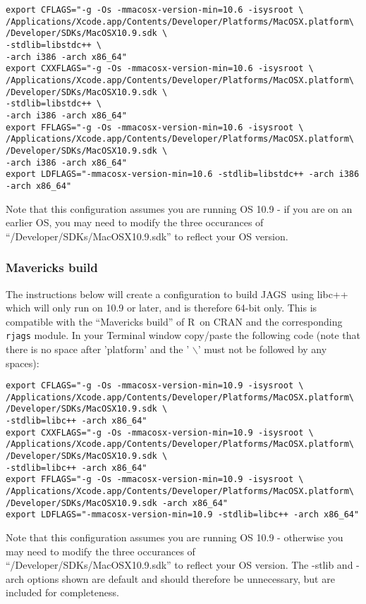 \documentclass[11pt, a4paper, titlepage]{article}
\newcommand{\JAGS}{\textsf{JAGS}}
\newcommand{\R}{\textsf{R}}
\begin{document}
\begin{verbatim}
export CFLAGS="-g -Os -mmacosx-version-min=10.6 -isysroot \
/Applications/Xcode.app/Contents/Developer/Platforms/MacOSX.platform\
/Developer/SDKs/MacOSX10.9.sdk \
-stdlib=libstdc++ \
-arch i386 -arch x86_64"
export CXXFLAGS="-g -Os -mmacosx-version-min=10.6 -isysroot \
/Applications/Xcode.app/Contents/Developer/Platforms/MacOSX.platform\
/Developer/SDKs/MacOSX10.9.sdk \
-stdlib=libstdc++ \
-arch i386 -arch x86_64"
export FFLAGS="-g -Os -mmacosx-version-min=10.6 -isysroot \
/Applications/Xcode.app/Contents/Developer/Platforms/MacOSX.platform\
/Developer/SDKs/MacOSX10.9.sdk \
-arch i386 -arch x86_64"
export LDFLAGS="-mmacosx-version-min=10.6 -stdlib=libstdc++ -arch i386 -arch x86_64"
\end{verbatim}

Note that this configuration assumes you are running OS 10.9 - if you 
are on an earlier OS, you may need to modify the three occurances of 
``/Developer/SDKs/MacOSX10.9.sdk'' to reflect your OS version.

\subsubsection{Mavericks build}

The instructions below will create a configuration to build \JAGS\ using 
libc++ which will only run on 10.9 or later, and is therefore 64-bit only.
This is compatible with the ``Mavericks build'' of \R\ on CRAN and the 
corresponding \texttt{rjags} module.  In your Terminal window copy/paste 
the following code (note that there is no space after 'platform' and the '
$\backslash$' must not be followed by any spaces):

\begin{verbatim}
export CFLAGS="-g -Os -mmacosx-version-min=10.9 -isysroot \
/Applications/Xcode.app/Contents/Developer/Platforms/MacOSX.platform\
/Developer/SDKs/MacOSX10.9.sdk \
-stdlib=libc++ -arch x86_64"
export CXXFLAGS="-g -Os -mmacosx-version-min=10.9 -isysroot \
/Applications/Xcode.app/Contents/Developer/Platforms/MacOSX.platform\
/Developer/SDKs/MacOSX10.9.sdk \
-stdlib=libc++ -arch x86_64"
export FFLAGS="-g -Os -mmacosx-version-min=10.9 -isysroot \
/Applications/Xcode.app/Contents/Developer/Platforms/MacOSX.platform\
/Developer/SDKs/MacOSX10.9.sdk -arch x86_64"
export LDFLAGS="-mmacosx-version-min=10.9 -stdlib=libc++ -arch x86_64"
\end{verbatim}

Note that this configuration assumes you are running OS 10.9 - otherwise you 
may need to modify the three occurances of ``/Developer/SDKs/MacOSX10.9.sdk'' 
to reflect your OS version.  The -stlib and -arch options shown are default and 
should therefore be unnecessary, but are included for completeness.
\end{document}
